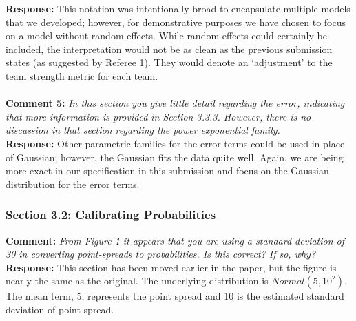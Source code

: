 \documentclass[11pt]{article} %
\begin{document}
{\bf Response:} This notation was intentionally broad to encapsulate multiple models that we developed; however, for demonstrative purposes we have chosen to focus on a model without random effects. While random effects could certainly be included, the interpretation would not be as clean as the previous submission states (as suggested by Referee 1). They would denote an `adjustment' to the team strength metric for each team.\\
\\
{\bf Comment 5:} \emph{In this section you give little detail regarding the error, indicating that more information is provided in Section 3.3.3. However, there is no discussion in that section regarding the power exponential family.\\}
{\bf Response:} Other parametric families for the error terms could be used in place of Gaussian; however, the Gaussian fits the data quite well. Again, we are being more exact in our specification in this submission and focus on the Gaussian distribution for the error terms.\\

\subsubsection*{Section 3.2: Calibrating Probabilities}
{\bf Comment:} \emph{From Figure 1 it appears that you are using a standard deviation of 30 in converting point-spreads to probabilities. Is this correct? If so, why?\\}
{\bf Response:} This section has been moved earlier in the paper, but the figure is nearly the same as the original. The underlying distribution is $Normal(5,10^2).$ The mean term, 5, represents the point spread and 10 is the estimated standard deviation of point spread. \\
\end{document}
